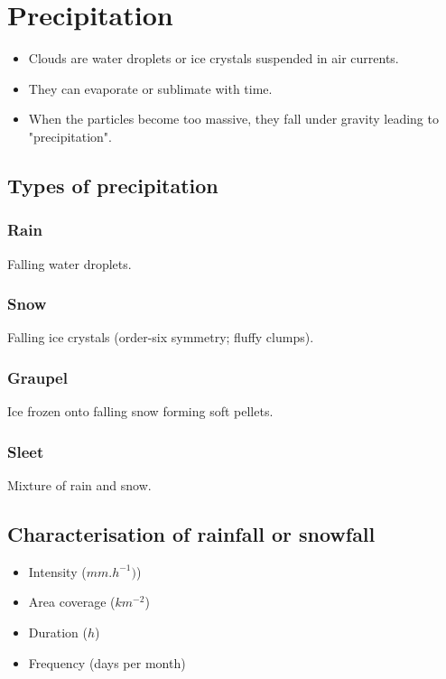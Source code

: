 \documentclass[11pt]{article}
\begin{document}
\newpage
\section{Precipitation}
\label{sec:org47a5c89}
\begin{itemize}
\item Clouds are water droplets or ice crystals suspended in air currents.
\item They can evaporate or sublimate with time.
\item When the particles become too massive, they fall under gravity leading to "precipitation".
\end{itemize}
\subsection{Types of precipitation}
\label{sec:org1a34b28}

\subsubsection{Rain}
\label{sec:orgc39de6e}
Falling water droplets.
\subsubsection{Snow}
\label{sec:orgb4b642e}
Falling ice crystals (order-six symmetry; fluffy clumps).
\subsubsection{Graupel}
\label{sec:orgd31eb59}
Ice frozen onto falling snow forming soft pellets.
\subsubsection{Sleet}
\label{sec:orgc01e8d7}
Mixture of rain and snow.
\subsection{Characterisation of rainfall or snowfall}
\label{sec:org1fcdd88}
\begin{itemize}
\item Intensity (\(\unit{mm.h^{-1}})\))
\item Area coverage (\(\unit{km^{-2}}\))
\item Duration (\(\unit{h}\))
\item Frequency (days per month)
\end{itemize}

\newpage
\end{document}
